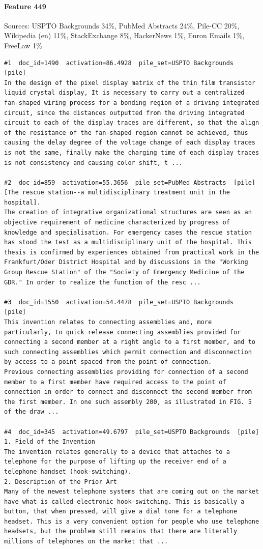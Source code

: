 \paragraph*{Feature 449} Sources: USPTO Backgrounds 34\%, PubMed Abstracts 24\%, Pile-CC 20\%, Wikipedia (en) 11\%, StackExchange 8\%, HackerNews 1\%, Enron Emails 1\%, FreeLaw 1\%

\begin{verbatim}
#1  doc_id=1490  activation=86.4928  pile_set=USPTO Backgrounds  [pile]
In the design of the pixel display matrix of the thin film transistor liquid crystal display, It is necessary to carry out a centralized fan-shaped wiring process for a bonding region of a driving integrated circuit, since the distances outputted from the driving integrated circuit to each of the display traces are different, so that the align of the resistance of the fan-shaped region cannot be achieved, thus causing the delay degree of the voltage change of each display traces is not the same, finally make the charging time of each display traces is not consistency and causing color shift, t ...

#2  doc_id=859  activation=55.3656  pile_set=PubMed Abstracts  [pile]
[The rescue station--a multidisciplinary treatment unit in the hospital].
The creation of integrative organizational structures are seen as an objective requirement of medicine characterized by progress of knowledge and specialisation. For emergency cases the rescue station has stood the test as a multidisciplinary unit of the hospital. This thesis is confirmed by experiences obtained from practical work in the Frankfurt/Oder District Hospital and by discussions in the "Working Group Rescue Station" of the "Society of Emergency Medicine of the GDR." In order to realize the function of the resc ...

#3  doc_id=1550  activation=54.4478  pile_set=USPTO Backgrounds  [pile]
This invention relates to connecting assemblies and, more particularly, to quick release connecting assemblies provided for connecting a second member at a right angle to a first member, and to such connecting assemblies which permit connection and disconnection by access to a point spaced from the point of connection.
Previous connecting assemblies providing for connection of a second member to a first member have required access to the point of connection in order to connect and disconnect the second member from the first member. In one such assembly 200, as illustrated in FIG. 5 of the draw ...

#4  doc_id=345  activation=49.6797  pile_set=USPTO Backgrounds  [pile]
1. Field of the Invention
The invention relates generally to a device that attaches to a telephone for the purpose of lifting up the receiver end of a telephone handset (hook-switching).
2. Description of the Prior Art
Many of the newest telephone systems that are coming out on the market have what is called electronic hook-switching. This is basically a button, that when pressed, will give a dial tone for a telephone headset. This is a very convenient option for people who use telephone headsets, but the problem still remains that there are literally millions of telephones on the market that ...


\end{verbatim}
